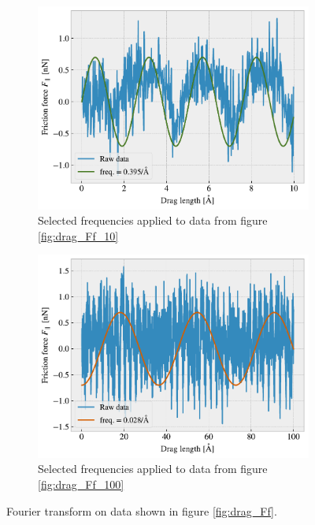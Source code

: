 \begin{figure}[H]
\begin{subfigure}[b]{0.49\textwidth}
      \centering
      \includegraphics[width=\textwidth]{figures/baseline/ft_sine_zoom.pdf}
      \caption{Selected frequencies applied to data from figure \ref{fig:drag_Ff_10}}
      \label{fig:ft_c}
  \end{subfigure}
  \hfill
  \begin{subfigure}[b]{0.49\textwidth}
      \centering
      \includegraphics[width=\textwidth]{figures/baseline/ft_sine.pdf}
      \caption{Selected frequencies applied to data from figure \ref{fig:drag_Ff_100}}
      \label{fig:ft_d}
  \end{subfigure}
  \hfill
     \caption{Fourier transform on data shown in figure \ref{fig:drag_Ff}.}
     \label{fig:ft}
\end{figure}


